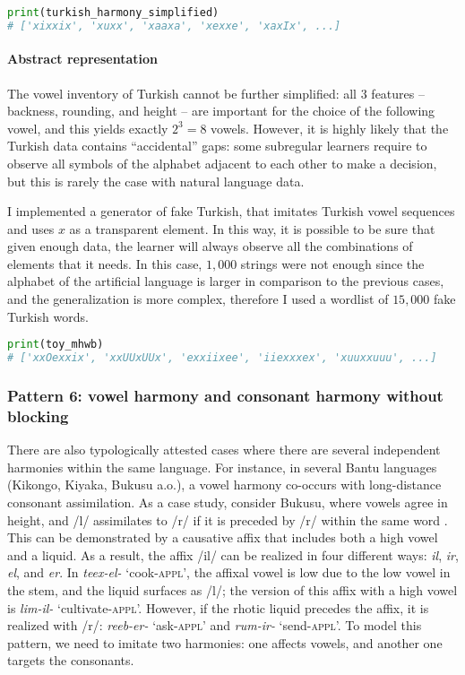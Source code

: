 \begin{lstlisting}[language=Python]
print(turkish_harmony_simplified)
# ['xixxix', 'xuxx', 'xaaxa', 'xexxe', 'xaxIx', ...]
\end{lstlisting}


\paragraph{Abstract representation}

The vowel inventory of Turkish cannot be further simplified: all $3$ features -- backness, rounding, and height -- are important for the choice of the following vowel, and this yields exactly $2^3 = 8$ vowels.
However, it is highly likely that the Turkish data contains ``accidental'' gaps: some subregular learners require to observe all symbols of the alphabet adjacent to each other to make a decision, but this is rarely the case with natural language data.

I implemented a generator of fake Turkish, that imitates Turkish vowel sequences and uses $x$ as a transparent element.
In this way, it is possible to be sure that given enough data, the learner will always observe all the combinations of elements that it needs.
In this case, $1,000$ strings were not enough since the alphabet of the artificial language is larger in comparison to the previous cases, and the generalization is more complex, therefore I used a wordlist of $15,000$ fake Turkish words.

\begin{lstlisting}[language=Python]
print(toy_mhwb)
# ['xxOexxix', 'xxUUxUUx', 'exxiixee', 'iiexxxex', 'xuuxxuuu', ...]
\end{lstlisting}


\subsubsection{Pattern 6: vowel harmony and consonant harmony without blocking}

There are also typologically attested cases where there are several independent harmonies within the same language.
For instance, in several Bantu languages (Kikongo, Kiyaka, Bukusu a.o.), a vowel harmony co-occurs with long-distance consonant assimilation.
As a case study, consider Bukusu, where vowels agree in height, and /l/ assimilates to /r/ if it is preceded by /r/ within the same word \citep{Odden1994,Hansson2010}.
This can be demonstrated by a causative affix that includes both a high vowel and a liquid.
As a result, the affix /il/ can be realized in four different ways: \emph{il}, \emph{ir}, \emph{el}, and \emph{er}.
In \emph{teex-el-} `cook-\textsc{appl}', the affixal vowel is low due to the low vowel in the stem, and the liquid surfaces as /l/; the version of this affix with a high vowel is \emph{lim-il-} `cultivate-\textsc{appl}'.
However, if the rhotic liquid precedes the affix, it is realized with /r/: \emph{reeb-er-} `ask-\textsc{appl}' and \emph{rum-ir-} `send-\textsc{appl}'.
To model this pattern, we need to imitate two harmonies: one affects vowels, and another one targets the consonants.

